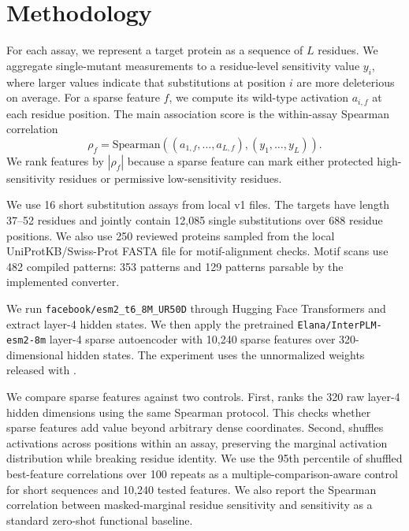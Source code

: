 \section{Methodology}
\label{sec:methodology}

 For each assay, we represent a target protein as a sequence of $L$ residues. We aggregate single-mutant \dms measurements to a residue-level sensitivity value $y_i$, where larger values indicate that substitutions at position $i$ are more deleterious on average. For a sparse feature $f$, we compute its wild-type activation $a_{i,f}$ at each residue position. The main association score is the within-assay Spearman correlation
\begin{equation}
    \rho_f = \mathrm{Spearman}\left((a_{1,f}, \ldots, a_{L,f}), (y_1, \ldots, y_L)\right).
\end{equation}
We rank features by $|\rho_f|$ because a sparse feature can mark either protected high-sensitivity residues or permissive low-sensitivity residues.

 We use 16 short substitution assays from local \proteingym v1 \dms files. The targets have length 37--52 residues and jointly contain 12,085 single substitutions over 688 residue positions. We also use 250 reviewed \swissprot proteins sampled from the local UniProtKB/Swiss-Prot FASTA file for motif-alignment checks. Motif scans use 482 compiled patterns: 353 \elm patterns and 129 \prosite patterns parsable by the implemented converter.

 We run \texttt{facebook/esm2\_t6\_8M\_UR50D} through Hugging Face Transformers and extract layer-4 hidden states. We then apply the pretrained \texttt{Elana/InterPLM-esm2-8m} layer-4 sparse autoencoder with 10,240 sparse features over 320-dimensional hidden states. The experiment uses the unnormalized \sae weights released with \interplm.

 We compare sparse features against two controls. First, \rawhidden ranks the 320 raw \esm layer-4 hidden dimensions using the same Spearman protocol. This checks whether sparse features add value beyond arbitrary dense coordinates. Second, \shuffledsae shuffles \sae activations across positions within an assay, preserving the marginal activation distribution while breaking residue identity. We use the 95th percentile of shuffled best-feature correlations over 100 repeats as a multiple-comparison-aware control for short sequences and 10,240 tested features. We also report the Spearman correlation between \esm masked-marginal residue sensitivity and \dms sensitivity as a standard zero-shot functional baseline.

